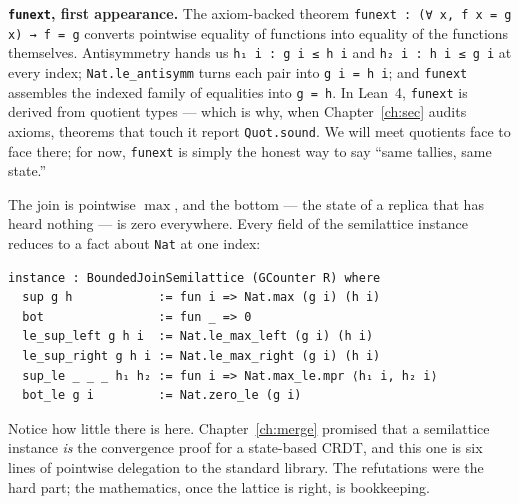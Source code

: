 \documentclass[12pt, a4paper, openright]{book}
\theoremstyle{thmstyle}
\theoremstyle{defstyle}
\newcommand{\lc}[1]{\texttt{#1}}
\newenvironment{notebox}{%
  \begin{tcolorbox}[notebox]%
}{\end{tcolorbox}}
\newcounter{refutation}[chapter]
\begin{document}
\begin{notebox}
  \textbf{\lc{funext}, first appearance.} The axiom-backed theorem
  \lc{funext : (∀ x, f x = g x) → f = g} converts pointwise equality of
  functions into equality of the functions themselves. Antisymmetry
  hands us \lc{h₁ i : g i ≤ h i} and \lc{h₂ i : h i ≤ g i} at every
  index; \lc{Nat.le_antisymm} turns each pair into \lc{g i = h i}; and
  \lc{funext} assembles the indexed family of equalities into
  \lc{g = h}. In Lean~4, \lc{funext} is derived from quotient types ---
  which is why, when Chapter~\ref{ch:sec} audits axioms, theorems that
  touch it report \lc{Quot.sound}. We will meet quotients face to face
  there; for now, \lc{funext} is simply the honest way to say ``same
  tallies, same state.''
\end{notebox}

The join is pointwise $\max$, and the bottom --- the state of a replica
that has heard nothing --- is zero everywhere. Every field of the
semilattice instance reduces to a fact about \lc{Nat} at one index:

\begin{verbatim}
instance : BoundedJoinSemilattice (GCounter R) where
  sup g h            := fun i => Nat.max (g i) (h i)
  bot                := fun _ => 0
  le_sup_left g h i  := Nat.le_max_left (g i) (h i)
  le_sup_right g h i := Nat.le_max_right (g i) (h i)
  sup_le _ _ _ h₁ h₂ := fun i => Nat.max_le.mpr ⟨h₁ i, h₂ i⟩
  bot_le g i         := Nat.zero_le (g i)
\end{verbatim}

Notice how little there is here. Chapter~\ref{ch:merge} promised that a
semilattice instance \emph{is} the convergence proof for a state-based
CRDT, and this one is six lines of pointwise delegation to the standard
library. The refutations were the hard part; the mathematics, once the
lattice is right, is bookkeeping.
\end{document}
